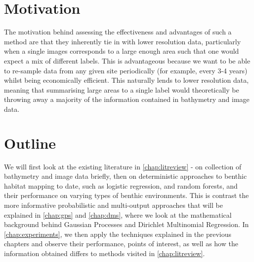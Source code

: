 \section{Motivation}

The motivation behind assessing the effectiveness and advantages of such a method are that they inherently tie in with lower resolution data, particularly when a single images corresponds to a large enough area such that one would expect a mix of different labels. This is advantageous because we want to be able to re-sample data from any given site periodically (for example, every 3-4 years) whilst being economically efficient. This naturally lends to lower resolution data, meaning that summarising large areas to a single label would theoretically be throwing away a majority of the information contained in bathymetry and image data.

\section{Outline}

We will first look at the existing literature in \autoref{chap:litreview} - on collection of bathymetry and image data briefly, then on deterministic approaches to benthic habitat mapping to date, such as logistic regression, and random forests, and their performance on varying types of benthic environments. This is contrast the more informative probabilistic and multi-output approaches that will be explained in \autoref{chap:gps} and \autoref{chap:dms}, where we look at the mathematical background behind Gaussian Processes and Dirichlet Multinomial Regression. In \autoref{chap:experiments}, we then apply the techniques explained in the previous chapters and observe their performance, points of interest, as well as how the information obtained differs to methods visited in \autoref{chap:litreview}. 
